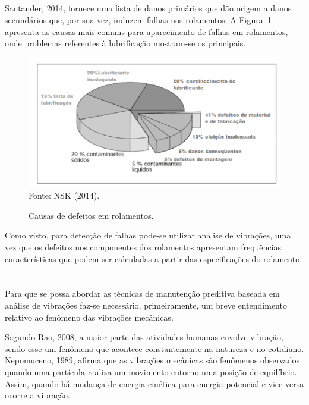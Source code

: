 \documentclass[
	12pt,				
	oneside,			
	a4paper,			
	english,			
	brazil,			
	]{abntex2ppgsi}
\begin{document}
\subsection{}

Santander, 2014, fornece uma lista de danos primários que dão origem a danos secundários que, por sua vez, induzem falhas nos rolamentos. A Figura~\ref{falhas_comuns_rolamentos} apresenta as causas mais comuns para aparecimento de falhas em rolamentos, onde problemas referentes à lubrificação mostram-se os principais.

\begin{figure}[H]
\centering
\caption {Causas de defeitos em rolamentos.}
\includegraphics[width=\textwidth,height=\textheight,keepaspectratio]{falhas_comuns_rolamentos} \\
Fonte: NSK (2014).
\label{falhas_comuns_rolamentos}
\end{figure}

Como visto, para detecção de falhas pode-se utilizar análise de vibrações, uma vez que os defeitos nos componentes dos rolamentos apresentam frequências características que podem ser calculadas a partir das especificações do rolamento. 

\newpage
\section{}

Para que se possa abordar as técnicas de manutenção preditiva baseada em análise de vibrações faz-se necessário, primeiramente, um breve entendimento relativo ao fenômeno das vibrações mecânicas. 

Segundo Rao, 2008, a maior parte das atividades humanas envolve vibração, sendo esse um fenômeno que acontece constantemente na natureza e no cotidiano. Nepomuceno, 1989, afirma que as vibrações mecânicas são fenômenos observados quando uma partícula realiza um movimento entorno uma posição de equilíbrio. Assim, quando há mudança de energia cinética para energia potencial e vice-versa ocorre a vibração. 
\end{document}
